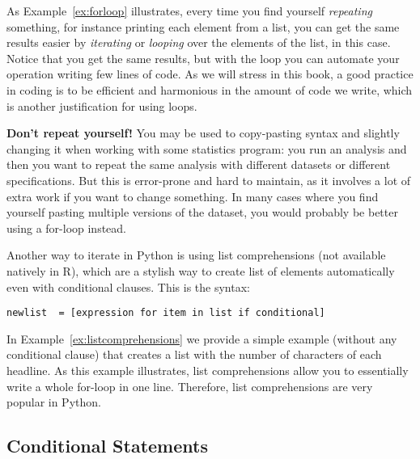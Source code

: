 
As Example~\ref{ex:forloop} illustrates, every time you find yourself
\emph{repeating} something, for instance printing each element from a
list, you can get the same results easier by \emph{iterating} or
\emph{looping} over the elements of the list, in this case.  Notice
that you get the same results, but with the loop you can automate your
operation writing few lines of code. As we will stress in this
book, a good practice in coding is to be efficient and harmonious in
the amount of code we write, which is another justification for using
loops.

\begin{feature}
  \textbf{Don't repeat yourself!}
  You may be used to copy-pasting
  syntax and slightly changing it when working with some statistics
  program: you run an analysis and then you want to repeat the same
  analysis with different datasets or different specifications. But
  this is error-prone and hard to maintain, as it involves a lot of
  extra work if you want to change something. In many cases where you
  find yourself pasting multiple versions of the dataset, you would
  probably be better using a for-loop instead.
  \end{feature}


Another way to iterate in Python is using list comprehensions  (not available natively in R), which are a stylish way to create list of elements automatically even with conditional clauses. This is the syntax:

\begin{verbatim}
newlist  = [expression for item in list if conditional]
\end{verbatim}

In Example~\ref{ex:listcomprehensions} we provide a simple example (without any
conditional clause) that creates a list with the number of characters
of each headline. As this example illustrates, list comprehensions
allow you to essentially write a whole for-loop in one
line. Therefore, list comprehensions are very popular in Python.




\subsection{Conditional Statements}

